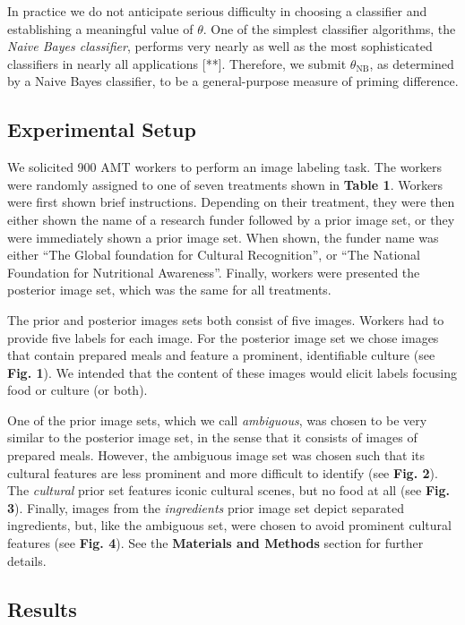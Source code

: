 \documentclass[a4paper]{report}
\begin{document}
In practice we do not anticipate serious difficulty in choosing a classifier
and establishing a meaningful value of $\theta$.  One of the simplest 
classifier algorithms, the \textit{Naive Bayes classifier}, performs very 
nearly as well as the most sophisticated classifiers in nearly all 
applications [**].  Therefore, we submit $\theta_\text{NB}$, as determined by 
a Naive Bayes classifier, to be a general-purpose measure of priming 
difference.  



\subsection*{Experimental Setup}
We solicited 900 AMT workers to perform an image labeling task.  The workers
were randomly assigned to one of seven treatments shown in 
\textbf{Table 1}.  Workers were first shown brief instructions.
Depending on their treatment, they were then either shown the name of 
a research funder followed by a prior image set, or they were immediately 
shown a prior image set. When shown, the funder name was either
``The Global foundation for Cultural Recognition'', or 
``The National Foundation for Nutritional Awareness''.  Finally, workers were 
presented the posterior image set, which was the same for all treatments.

The prior and posterior images sets both consist of five images. Workers had
to provide five labels for each image.  For the posterior image set we chose 
images that contain prepared meals and feature a prominent, identifiable 
culture (see \textbf{Fig. 1}).  We intended that the content of these images 
would elicit labels focusing food or culture (or both).

One of the prior image sets, which we call \textit{ambiguous}, was chosen to
be very similar to the posterior image set, in the sense that it consists of
images of prepared meals.  However, the ambiguous image set was chosen such 
that its cultural features are less prominent and more difficult to identify 
(see \textbf{Fig. 2}).  
The \textit{cultural} prior set features iconic cultural scenes, but no food 
at all (see \textbf{Fig. 3}).  Finally, images from
the \textit{ingredients} prior image set depict separated ingredients, but, 
like the ambiguous set, were chosen to avoid prominent cultural features (see 
\textbf{Fig. 4}).  See the \textbf{Materials and Methods} section for further 
details.

\subsection*{Results}
\end{document}
